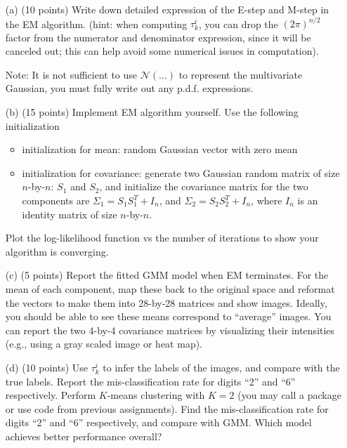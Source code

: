 \documentclass[12pt]{article}
\begin{document}
\begin{enumerate}

\item[(a)] (10 points) Write down detailed expression of the E-step and M-step in the EM algorithm. (hint: when computing $\tau_k^i$, you can drop the $(2\pi)^{n/2}$ factor from the numerator and denominator expression, since it will be canceled out; this can help avoid some numerical issues in computation).

Note: It is not sufficient to use $\mathcal{N(...)}$ to represent the multivariate Gaussian, you must fully write out any p.d.f. expressions. 

\item[(b)] (15 points) Implement EM algorithm yourself. Use the following initialization
\begin{itemize}
\item initialization for mean: random Gaussian vector with zero mean
\item initialization for covariance: generate two Gaussian random matrix of size $n$-by-$n$: $S_1$ and $S_2$, and initialize the covariance matrix for the two components are $\Sigma_1 = S_1 S_1^T + I_n$, and  $\Sigma_2 = S_2 S_2^T + I_n$, where $I_n$ is an identity matrix of size $n$-by-$n$. 
\end{itemize}
Plot the log-likelihood function vs the number of iterations to show your algorithm is converging.

\item[(c)] (5 points) Report the fitted GMM model when EM terminates. For the mean of each component, map these back to the original space and reformat the vectors to make them into 28-by-28 matrices and show images. Ideally, you should be able to see these means correspond to ``average'' images.  You can report the two 4-by-4 covariance matrices by visualizing their intensities (e.g., using a gray scaled image or heat map). 

\item[(d)] (10 points) Use $\tau_{k}^i$ to infer the labels of the images, and compare with the true labels. Report the mis-classification rate for digits ``2'' and ``6'' respectively. Perform $K$-means clustering with $K=2$ (you may call a package or use code from previous assignments). Find the mis-classification rate for digits ``2'' and ``6'' respectively, and compare with GMM. Which model achieves better performance overall?

\end{enumerate}
\end{document}
